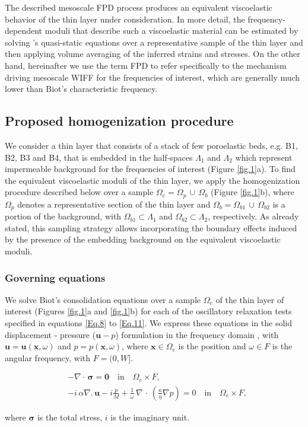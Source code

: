 \documentclass[draft]{agujournal2019}
\begin{document}
The described mesoscale FPD process produces an equivalent viscoelastic behavior of the thin layer under consideration. In more detail, the frequency-dependent  moduli that describe such a viscoelastic material can be estimated by solving \citeauthor{Biot1941}'s \citeyear{Biot1941} quasi-static equations over a representative sample of the thin layer and then applying volume averaging of the inferred strains and stresses. On the other hand, hereinafter we use the term FPD to refer specifically to the mechanism driving mesoscale WIFF for the frequencies of interest, which are generally much lower than Biot's characteristic frequency.

\subsection{Proposed homogenization procedure}
We consider a thin layer that consists of a stack of few poroelastic beds, e.g. B1, B2, B3 and B4, that is embedded in the half-spaces $\Lambda_1$ and $\Lambda_2$ which represent impermeable background for the frequencies of interest (Figure \ref{fig.1}a). To find the equivalent viscoelastic moduli of the thin layer, we apply the homogenization procedure described below over a sample $\Omega_e = \Omega_p \,\cup \, \Omega_b$ (Figure \ref{fig.1}b), where $\Omega_p$ denotes a representative section of the thin  layer and $\Omega_b =\Omega_{b1}\, \cup \, \Omega_{b2}$ is a portion of the background, with $\Omega_{b1} \subset \Lambda_1$ and $\Omega_{b2} \subset \Lambda_2$, respectively. As already stated, this sampling strategy allows incorporating the boundary effects induced by the presence of the embedding background on the equivalent viscoelastic moduli.


\subsubsection{Governing equations}
We solve Biot's consolidation equations \cite{Biot1941, Biot1962} over a sample  $\Omega_e$ of the thin layer of interest (Figures \ref{fig.1}a and \ref{fig.1}b) for each of the oscillatory relaxation tests specified in equations
\eqref{Eq.8} to \eqref{Eq.11}. We express these equations in the solid displacement - pressure ($\bm{u}-p$) formulation in the frequency domain \cite{Quintal2011,Favino2020},  with $\bm{u} = \bm{u}(\bm{x}, \omega)$ and $p = p(\bm{x},\omega)$, where $\bm{x} \in \Omega_e$ is the position and $\omega \in F$ is the angular frequency, with $F =(0,W]$. 
\begin{linenomath*}
\begin{equation}\label{Eq.6}
\begin{split}
& - \nabla \cdot \, \bm{\sigma} = \bm{0}  \quad  \textrm{in} \quad \Omega_e \times F,  \\
& - i \, \alpha \nabla . \, \bm{u} -i \frac{p}{M} + \frac{1}{\omega} \,\nabla \, \cdot \, \left( \frac{\kappa}{\eta} \nabla p\right)  =0 \quad  \textrm{in} \quad \Omega_e \times F,
\end{split}
\end{equation}
\end{linenomath*}
where $\bm{\sigma}$ is the total stress, $i$ is the imaginary unit.
\end{document}
